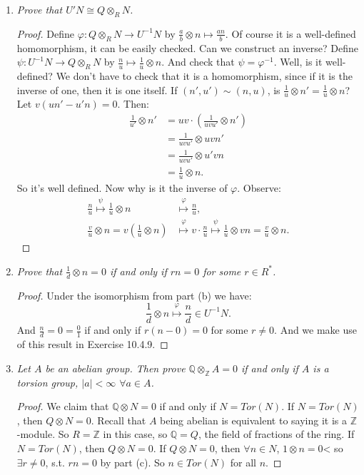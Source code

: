 \documentclass[12pt]{amsbook}
\theoremstyle{plain}
\numberwithin{section}{chapter}
\numberwithin{equation}{chapter}
\theoremstyle{definition}
\theoremstyle{remark}
\newcommand{\z}{\mathbb{Z}}
\newcommand{\Q}{\mathbb{Q}}
\newcommand{\bee}{\begin{equation}\begin{aligned}}
\newcommand{\eee}{\end{aligned}\end{equation}}
\newcommand{\fracc}{\frac}
\newcommand{\tens}{\otimes}
\renewcommand{\phi}{\varphi}
\begin{document}
\begin{enumerate}[label=\arabic*.]
\begin{enumerate}
\item \textit{Prove that $U'N \cong Q \tens_R N$. }

\begin{proof}
Define $\phi: Q \tens_R N \to U^{-1}N$ by $\fracc{a}{b}\tens n \mapsto \fracc{an}{b}$. Of course it is a well-defined homomorphism, it can be easily checked. Can we construct an inverse? Define $\psi: U^{-1}N \to Q \tens_R N$ by $\fracc{n}{u} \mapsto \fracc{1}{u}\tens n$. And check that $\psi = \phi^{-1}$. Well, is it well-defined? We don't have to check that it is a homomorphism, since if it is the inverse of one, then it is one itself. If $(n',u') \sim (n,u)$, is $\fracc{1}{u}\tens n' = \fracc{1}{u}\tens n$? Let $v(un' - u'n) = 0$. Then:
\bee
\fracc{1}{u'}\tens n' &= uv \cdot \left(\fracc{1}{uvu'}\tens n' \right)\\
&= \fracc{1}{uvu'}\tens uvn'\\
&= \fracc{1}{uvu'}\tens u'vn\\
&= \fracc{1}{u}\tens n.
\eee
So it's well defined. Now why is it the inverse of $\phi$. Observe: 
\bee
\fracc{n}{u}\overset{\psi}{\mapsto} \fracc{1}{u}\tens n &\overset{\phi}{\mapsto} \fracc{n}{u},\\
\fracc{v}{u}\tens n = v(\fracc{1}{u}\tens n) &\overset{\phi}{\mapsto}
v \cdot \fracc{n}{u}\overset{\psi}{\mapsto} \fracc{1}{u}\tens vn = \fracc{v}{u}\tens n.
\eee
\end{proof}

\item \textit{Prove that $\fracc{1}{d}\tens n = 0$ if and only if $rn = 0$ for some $r \in R^*$. }

\begin{proof}
Under the isomorphism from part (b) we have:
$$
\fracc{1}{d}\tens n \overset{\phi}{\mapsto} \fracc{n}{d}\in U^{-1}N.
$$
And $\fracc{n}{d} = 0 = \fracc{0}{1}$ if and only if $r(n - 0) = 0$ for some $r \neq 0$. And we make use of this result in Exercise 10.4.9. 
\end{proof}

\item \textit{Let $A$ be an abelian group. Then prove $\Q \tens_\z A = 0$ if and only if $A$ is a torsion group, $|a| < \infty$ $\forall a \in A$. }

\begin{proof}
We claim that $\Q \tens N = 0$ if and only if $N = Tor(N)$. If $N = Tor(N)$, then $Q \tens N = 0$. Recall that $A$ being abelian is equivalent to saying it is a $\z$-module. So $R = \z$ in this case, so $\Q = Q$, the field of fractions of the ring. If $N = Tor(N)$, then $Q \tens N =0$. If $Q \tens N = 0$, then $\forall n \in N$, $1 \tens n = 0$< so $\exists r \neq 0$, s.t. $rn = 0$ by part (c). So $n \in Tor(N)$ for all $n$. 
\end{proof}


\end{enumerate}
\end{enumerate}
\end{document}
